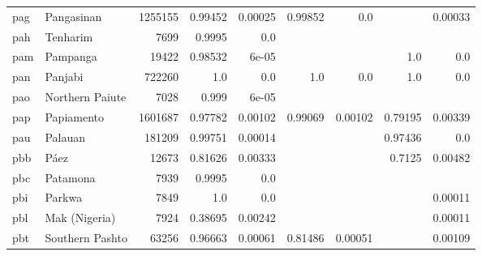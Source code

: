 \documentclass[11pt]{article}
\begin{document}
\begin{table*}[h]
{\begin{tabular}{llrrrrrrr}
pag         & Pangasinan         & 1255155         & 0.99452         & 0.00025         & 0.99852         & 0.0         &          & 0.00033         \\

pah         & Tenharim         & 7699         & 0.9995         & 0.0         &          &          &          &          \\

pam         & Pampanga         & 19422         & 0.98532         & 6e-05         &          &          & 1.0         & 0.0         \\

pan         & Panjabi         & 722260         & 1.0         & 0.0         & 1.0         & 0.0         & 1.0         & 0.0         \\

pao         & Northern Paiute         & 7028         & 0.999         & 6e-05         &          &          &          &          \\

pap         & Papiamento         & 1601687         & 0.97782         & 0.00102         & 0.99069         & 0.00102         & 0.79195         & 0.00339         \\

pau         & Palauan         & 181209         & 0.99751         & 0.00014         &          &          & 0.97436         & 0.0         \\

pbb         & Páez         & 12673         & 0.81626         & 0.00333         &          &          & 0.7125         & 0.00482         \\

pbc         & Patamona         & 7939         & 0.9995         & 0.0         &          &          &          &          \\

pbi         & Parkwa         & 7849         & 1.0         & 0.0         &          &          &          & 0.00011         \\

pbl         & Mak (Nigeria)         & 7924         & 0.38695         & 0.00242         &          &          &          & 0.00011         \\

pbt         & Southern Pashto         & 63256         & 0.96663         & 0.00061         & 0.81486         & 0.00051         &          & 0.00109         \\


\end{tabular}}
\end{table*}
\end{document}
